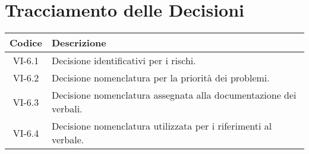 \section*{Tracciamento delle Decisioni}

\begin{center}
	\begin{longtable}{|c|p{14.5cm}|}
	\hline
	\rowcolor{lighter-grayer}
	\textbf{Codice} & \textbf{Descrizione} \\
	\hline
	\endfirsthead
	
	\hline
	VI-6.1 & Decisione identificativi per i rischi. \\
	\hline
	VI-6.2 & Decisione nomenclatura per la priorità dei problemi. \\
	\hline
	VI-6.3 & Decisione nomenclatura assegnata alla documentazione dei verbali. \\
	\hline
	VI-6.4 & Decisione nomenclatura utilizzata per i riferimenti al verbale. \\
	\hline

	\end{longtable}
\end{center}